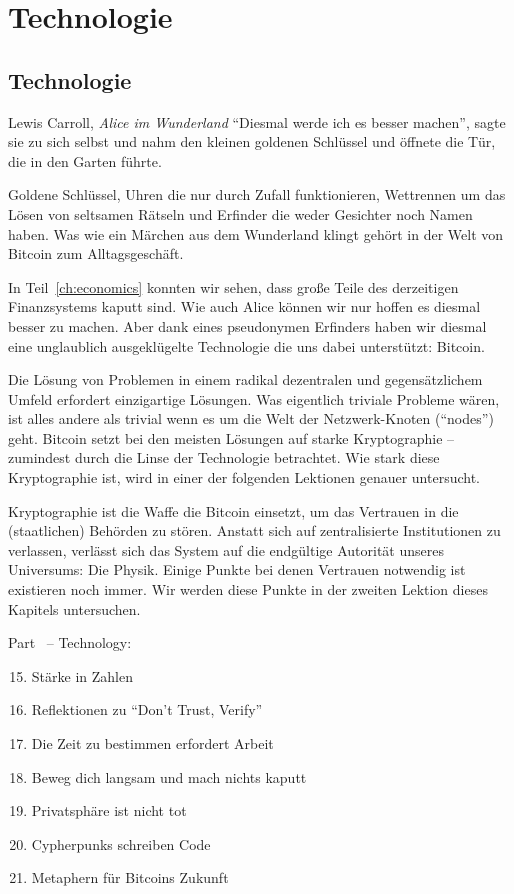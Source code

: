 \part{Technologie}
\label{ch:technology}
\chapter*{Technologie}

\begin{chapquote}{Lewis Carroll, \textit{Alice im Wunderland}}
\enquote{Diesmal werde ich es besser machen}, sagte sie zu sich selbst und nahm
den kleinen goldenen Schlüssel und öffnete die Tür, die in den Garten führte.
\end{chapquote}

Goldene Schlüssel, Uhren die nur durch Zufall funktionieren, Wettrennen um das
Lösen von seltsamen Rätseln und Erfinder die weder Gesichter noch Namen haben.
Was wie ein Märchen aus dem Wunderland klingt gehört in der Welt von Bitcoin zum
Alltagsgeschäft.

In Teil~\ref{ch:economics} konnten wir sehen, dass große Teile des derzeitigen
Finanzsystems kaputt sind. Wie auch Alice können wir nur hoffen es diesmal
besser zu machen. Aber dank eines pseudonymen Erfinders haben wir diesmal eine
unglaublich ausgeklügelte Technologie die uns dabei unterstützt: Bitcoin.

Die Lösung von Problemen in einem radikal dezentralen und gegensätzlichem Umfeld
erfordert einzigartige Lösungen. Was eigentlich triviale Probleme wären, ist
alles andere als trivial wenn es um die Welt der Netzwerk-Knoten (“nodes”) geht.
Bitcoin setzt bei den meisten Lösungen auf starke Kryptographie – zumindest
durch die Linse der Technologie betrachtet. Wie stark diese Kryptographie ist,
wird in einer der folgenden Lektionen genauer untersucht.

Kryptographie ist die Waffe die Bitcoin einsetzt, um das Vertrauen in die
(staatlichen) Behörden zu stören. Anstatt sich auf zentralisierte Institutionen
zu verlassen, verlässt sich das System auf die endgültige Autorität unseres
Universums: Die Physik. Einige Punkte bei denen Vertrauen notwendig ist
existieren noch immer. Wir werden diese Punkte in der zweiten Lektion dieses
Kapitels untersuchen.
~

\begin{samepage}
Part~\ref{ch:technology} -- Technology:

\begin{enumerate}
  \setcounter{enumi}{14}
  \item Stärke in Zahlen
  \item Reflektionen zu \enquote{Don't Trust, Verify}
  \item Die Zeit zu bestimmen erfordert Arbeit
  \item Beweg dich langsam und mach nichts kaputt
  \item Privatsphäre ist nicht tot
  \item Cypherpunks schreiben Code
  \item Metaphern für Bitcoins Zukunft
\end{enumerate}
\end{samepage}

